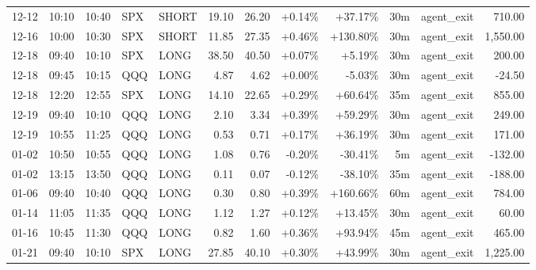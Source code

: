 \documentclass[11pt,a4paper,twoside]{article}
\begin{document}
\begin{center}
\begin{longtable}{>{\color{txtmain}}l l l l l r r r r r >{\color{txtmain}}l r}
12-12 & 10:10 & 10:40 & SPX & SHORT & 19.10 & 26.20 & \textcolor{wingreen}{+0.14\%} & \textcolor{wingreen}{+37.17\%} & 30m & agent\_exit & \textcolor{wingreen}{710.00} \\
12-16 & 10:00 & 10:30 & SPX & SHORT & 11.85 & 27.35 & \textcolor{wingreen}{+0.46\%} & \textcolor{wingreen}{+130.80\%} & 30m & agent\_exit & \textcolor{wingreen}{1,550.00} \\
12-18 & 09:40 & 10:10 & SPX & LONG & 38.50 & 40.50 & \textcolor{wingreen}{+0.07\%} & \textcolor{wingreen}{+5.19\%} & 30m & agent\_exit & \textcolor{wingreen}{200.00} \\
12-18 & 09:45 & 10:15 & QQQ & LONG & 4.87 & 4.62 & \textcolor{wingreen}{+0.00\%} & \textcolor{lossred}{-5.03\%} & 30m & agent\_exit & \textcolor{lossred}{-24.50} \\
12-18 & 12:20 & 12:55 & SPX & LONG & 14.10 & 22.65 & \textcolor{wingreen}{+0.29\%} & \textcolor{wingreen}{+60.64\%} & 35m & agent\_exit & \textcolor{wingreen}{855.00} \\
12-19 & 09:40 & 10:10 & QQQ & LONG & 2.10 & 3.34 & \textcolor{wingreen}{+0.39\%} & \textcolor{wingreen}{+59.29\%} & 30m & agent\_exit & \textcolor{wingreen}{249.00} \\
12-19 & 10:55 & 11:25 & QQQ & LONG & 0.53 & 0.71 & \textcolor{wingreen}{+0.17\%} & \textcolor{wingreen}{+36.19\%} & 30m & agent\_exit & \textcolor{wingreen}{171.00} \\
01-02 & 10:50 & 10:55 & QQQ & LONG & 1.08 & 0.76 & \textcolor{lossred}{-0.20\%} & \textcolor{lossred}{-30.41\%} & 5m & agent\_exit & \textcolor{lossred}{-132.00} \\
01-02 & 13:15 & 13:50 & QQQ & LONG & 0.11 & 0.07 & \textcolor{lossred}{-0.12\%} & \textcolor{lossred}{-38.10\%} & 35m & agent\_exit & \textcolor{lossred}{-188.00} \\
01-06 & 09:40 & 10:40 & QQQ & LONG & 0.30 & 0.80 & \textcolor{wingreen}{+0.39\%} & \textcolor{wingreen}{+160.66\%} & 60m & agent\_exit & \textcolor{wingreen}{784.00} \\
01-14 & 11:05 & 11:35 & QQQ & LONG & 1.12 & 1.27 & \textcolor{wingreen}{+0.12\%} & \textcolor{wingreen}{+13.45\%} & 30m & agent\_exit & \textcolor{wingreen}{60.00} \\
01-16 & 10:45 & 11:30 & QQQ & LONG & 0.82 & 1.60 & \textcolor{wingreen}{+0.36\%} & \textcolor{wingreen}{+93.94\%} & 45m & agent\_exit & \textcolor{wingreen}{465.00} \\
01-21 & 09:40 & 10:10 & SPX & LONG & 27.85 & 40.10 & \textcolor{wingreen}{+0.30\%} & \textcolor{wingreen}{+43.99\%} & 30m & agent\_exit & \textcolor{wingreen}{1,225.00} \\

\end{longtable}
\end{center}
\end{document}

